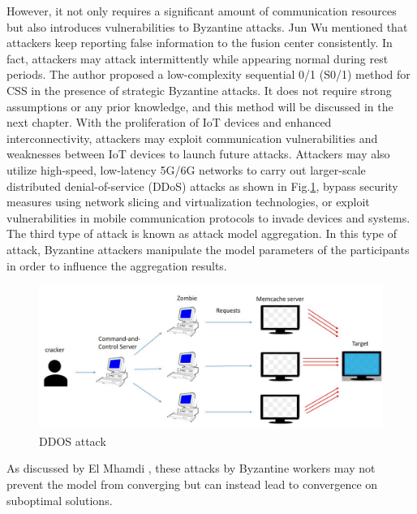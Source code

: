 \documentclass[conference]{IEEEtran}
\begin{document}
However, it not only requires a significant amount of communication resources but also introduces vulnerabilities to Byzantine attacks.
Jun Wu \cite{b119} mentioned that attackers keep reporting false information to the fusion center consistently.
In fact, attackers may attack intermittently while appearing normal during rest periods.
The author proposed a low-complexity sequential 0/1 (S0/1) method for CSS in the presence of strategic Byzantine attacks.
It does not require strong assumptions or any prior knowledge, and this method will be discussed in the next chapter.
With the proliferation of IoT devices and enhanced interconnectivity, attackers may exploit communication vulnerabilities and weaknesses 
between IoT devices to launch future attacks. Attackers may also utilize high-speed, low-latency 5G/6G networks to carry out 
larger-scale distributed denial-of-service (DDoS) attacks as shown in Fig.\ref{fig13}, bypass security measures using network slicing and virtualization technologies, or exploit vulnerabilities in mobile communication protocols to invade devices and systems.
The third type of attack is known as attack model aggregation.
In this type of attack, Byzantine attackers manipulate the model parameters of the participants in order
to influence the aggregation results.

\begin{figure}[htbp]
    \centerline{\includegraphics[width=0.8\linewidth,height=0.6\linewidth]{picture/ddos.jpg}}
    \caption{DDOS attack}
    \label{fig13}
\end{figure}


As discussed by El Mhamdi \cite{b120}, these attacks by Byzantine workers may not prevent the model from converging but can instead
lead to convergence on suboptimal solutions.
\end{document}
